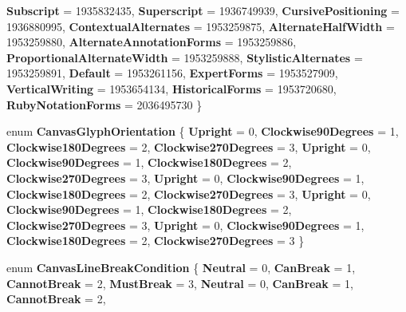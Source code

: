 \begin{DoxyCompactItemize}
{\bfseries Subscript} = 1935832435, 
{\bfseries Superscript} = 1936749939, 
{\bfseries Cursive\+Positioning} = 1936880995, 
\newline
{\bfseries Contextual\+Alternates} = 1953259875, 
{\bfseries Alternate\+Half\+Width} = 1953259880, 
{\bfseries Alternate\+Annotation\+Forms} = 1953259886, 
{\bfseries Proportional\+Alternate\+Width} = 1953259888, 
\newline
{\bfseries Stylistic\+Alternates} = 1953259891, 
{\bfseries Default} = 1953261156, 
{\bfseries Expert\+Forms} = 1953527909, 
{\bfseries Vertical\+Writing} = 1953654134, 
\newline
{\bfseries Historical\+Forms} = 1953720680, 
{\bfseries Ruby\+Notation\+Forms} = 2036495730
 \}
\item 
\mbox{\label{namespace_microsoft_1_1_graphics_1_1_canvas_1_1_text_a6d01f61e95bc019eb180ac64876b87fe}} 
enum {\bfseries Canvas\+Glyph\+Orientation} \{ \newline
{\bfseries Upright} = 0, 
{\bfseries Clockwise90\+Degrees} = 1, 
{\bfseries Clockwise180\+Degrees} = 2, 
{\bfseries Clockwise270\+Degrees} = 3, 
\newline
{\bfseries Upright} = 0, 
{\bfseries Clockwise90\+Degrees} = 1, 
{\bfseries Clockwise180\+Degrees} = 2, 
{\bfseries Clockwise270\+Degrees} = 3, 
\newline
{\bfseries Upright} = 0, 
{\bfseries Clockwise90\+Degrees} = 1, 
{\bfseries Clockwise180\+Degrees} = 2, 
{\bfseries Clockwise270\+Degrees} = 3, 
\newline
{\bfseries Upright} = 0, 
{\bfseries Clockwise90\+Degrees} = 1, 
{\bfseries Clockwise180\+Degrees} = 2, 
{\bfseries Clockwise270\+Degrees} = 3, 
\newline
{\bfseries Upright} = 0, 
{\bfseries Clockwise90\+Degrees} = 1, 
{\bfseries Clockwise180\+Degrees} = 2, 
{\bfseries Clockwise270\+Degrees} = 3
 \}
\item 
\mbox{\label{namespace_microsoft_1_1_graphics_1_1_canvas_1_1_text_a8700477798bba01933c71dbfcf9029cd}} 
enum {\bfseries Canvas\+Line\+Break\+Condition} \{ \newline
{\bfseries Neutral} = 0, 
{\bfseries Can\+Break} = 1, 
{\bfseries Cannot\+Break} = 2, 
{\bfseries Must\+Break} = 3, 
\newline
{\bfseries Neutral} = 0, 
{\bfseries Can\+Break} = 1, 
{\bfseries Cannot\+Break} = 2, 

\end{DoxyCompactItemize}
